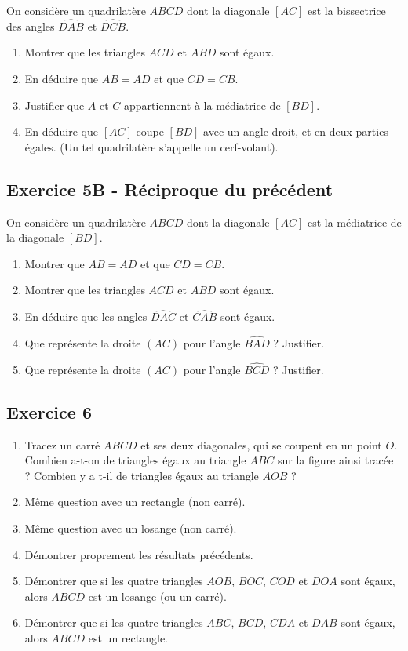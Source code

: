 \documentclass[12 pt]{extarticle}
\theoremstyle{plain}
\begin{document}
 On considère un quadrilatère $ABCD$ dont la diagonale $[AC]$ est la bissectrice des angles $\widehat{DAB}$ et $\widehat{DCB}$. \begin{enumerate}
 \item Montrer que les triangles $ACD$ et $ABD$ sont égaux. 
 \item En déduire que $AB= AD$ et que $CD=CB$. 
 \item Justifier que $A$ et $C$ appartiennent à la médiatrice de $[BD]$. 
 \item En déduire que $[AC]$ coupe $[BD]$ avec un angle droit, et en deux parties égales. (Un tel quadrilatère s'appelle un cerf-volant). 
 \end{enumerate}
 
 
 \subsection*{Exercice 5B - Réciproque du précédent}
 
 On considère un quadrilatère $ABCD$ dont la diagonale $[AC]$ est la médiatrice de la diagonale $[BD]$. \begin{enumerate}
 \item Montrer que $AB = AD$ et que $CD=CB$. 
 \item Montrer que les triangles $ACD$ et $ABD$ sont égaux. 
 \item En déduire que les angles $\widehat{DAC}$ et $\widehat{CAB}$ sont égaux. 
 \item Que représente la droite $(AC)$ pour l'angle $\widehat{BAD}$ ? Justifier. 
 \item Que représente la droite $(AC)$ pour l'angle $\widehat{BCD}$ ? Justifier. 
 \end{enumerate}
 
 
\subsection*{Exercice 6}
 
 \begin{enumerate}
 
 \item Tracez un carré $ABCD$ et ses deux diagonales, qui se coupent en un point $O$. Combien a-t-on de triangles égaux au triangle $ABC$ sur la figure ainsi tracée ? Combien y a t-il de triangles égaux au triangle $AOB$ ? 
  
\item Même question avec un rectangle (non carré). 
 
 \item Même question avec un losange (non carré). 

\item Démontrer proprement les résultats précédents. 

\item Démontrer que si les quatre triangles $AOB$, $BOC$, $COD$ et $DOA$ sont égaux, alors $ABCD$ est un losange (ou un carré). 

\item Démontrer que si les quatre triangles $ABC$, $BCD$, $CDA$ et $DAB$ sont égaux, alors $ABCD$ est un rectangle. 
\end{enumerate}



 
 	
\end{document}
